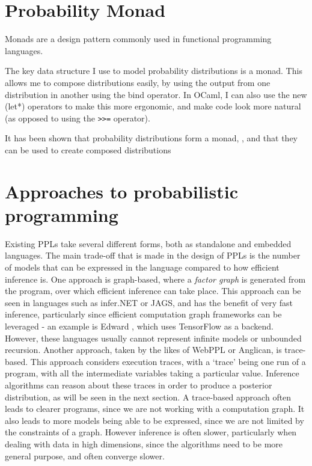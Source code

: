 \section{Probability Monad}
Monads are a design pattern commonly used in functional programming languages.

The key data structure I use to model probability distributions is a monad. This allows me to compose distributions easily, by using the output from one distribution in another using the bind operator. In OCaml, I can also use the new (let*) operators to make this more ergonomic, and make code look more natural (as opposed to using the \texttt{>>=} operator).

It has been shown that probability distributions form a monad, \cite{giry1982categorical} \cite{jones1989probabilistic}, and that they can be used to create composed distributions \cite{ramsey2002stochastic}

\section{Approaches to probabilistic programming}
Existing PPLs take several different forms, both as standalone and embedded languages. The main trade-off that is made in the design of PPLs is the number of models that can be expressed in the language compared to how efficient inference is. One approach is graph-based, where a \textit{factor graph} is generated from the program, over which efficient inference can take place. This approach can be seen in languages such as infer.NET or JAGS, and has the benefit of very fast inference, particularly since efficient computation graph frameworks can be leveraged - an example is Edward \cite{edward}, which uses TensorFlow as a backend. However, these languages usually cannot represent infinite models or unbounded recursion. Another approach, taken by the likes of WebPPL or Anglican, is trace-based. This approach considers execution traces, with a `trace' being one run of a program, with all the intermediate variables taking a particular value. Inference algorithms can reason about these traces in order to produce a posterior distribution, as will be seen in the next section. A trace-based approach often leads to clearer programs, since we are not working with a computation graph. It also leads to more models being able to be expressed, since we are not limited by the constraints of a graph. However inference is often slower, particularly when dealing with data in high dimensions, since the algorithms need to be more general purpose, and often converge slower.

